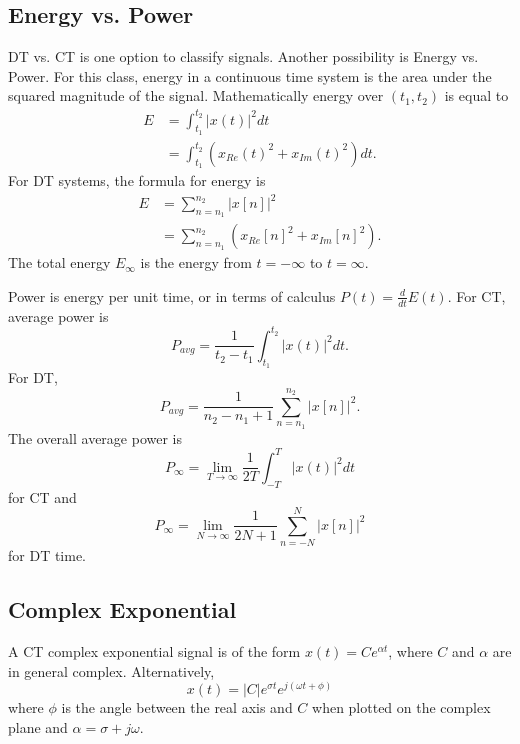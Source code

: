 \subsection{Energy vs. Power}
DT vs. CT is one option to classify signals. Another
possibility is Energy vs. Power. For this class, energy in a continuous
time system is the area under the squared magnitude of the signal. Mathematically
energy over $(t_1, t_2)$ is equal to
\begin{align}
    E & = \int_{t_1}^{t_2} |x(t)|^2 dt                     \\
      & = \int_{t_1}^{t_2} (x_{Re}(t)^2 + x_{Im}(t)^2) dt.
\end{align}
For DT systems, the formula for energy is
\begin{align}
    E & = \sum_{n=n_1}^{n_2} |x[n]|^2                     \\
      & = \sum_{n=n_1}^{n_2} (x_{Re}[n]^2 + x_{Im}[n]^2).
\end{align}
The total energy $E_\infty$ is the energy from $t = -\infty$ to $t = \infty$.

Power is energy per unit time, or in terms of calculus $P(t) = \frac{d}{dt}E(t)$.
For CT, average power is
\begin{equation}
    P_{avg} = \frac{1}{t_2 - t_1} \int_{t_1}^{t_2} |x(t)|^2 dt.
\end{equation}
For DT,
\begin{equation}
    P_{avg} = \frac{1}{n_2 - n_1 + 1} \sum_{n=n_1}^{n_2} |x[n]|^2.
\end{equation}
The overall average power is
\begin{equation}
    P_{\infty} = \lim_{T \rightarrow \infty} \frac{1}{2T} \int_{-T}^{T} |x(t)|^2 dt
\end{equation}
for CT and
\begin{equation}
    P_{\infty} = \lim_{N \rightarrow \infty} \frac{1}{2N + 1} \sum_{n=-N}^{N} |x[n]|^2
\end{equation}
for DT time.

\subsection{Complex Exponential}
A CT complex exponential signal is of the form 
$x(t) = Ce^{\alpha t}$, where $C$ and $\alpha$ 
are in general complex. Alternatively, 
\begin{equation}
    x(t) = |C| e^{\sigma t} e^{j(\omega t + \phi)}
\end{equation}
where $\phi$ is the angle between the real axis and 
$C$ when plotted on the complex plane and $\alpha = \sigma + j\omega$. 

